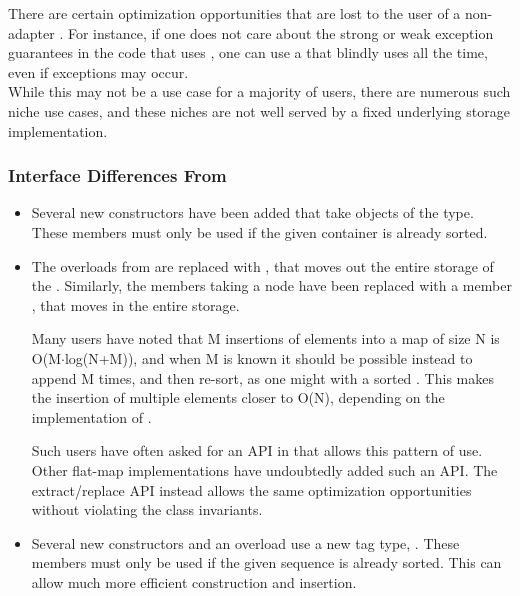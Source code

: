 There are certain optimization opportunities that are lost to the user of a
non-adapter .  For instance, if one does not care about the
strong or weak exception guarantees in the code that uses , one
can use a  that blindly uses  all the time, even if
exceptions may occur.\\

While this may not be a use case for a majority of users, there are numerous
such niche use cases, and these niches are not well served by a fixed
underlying storage implementation.

\subsubsection{Interface Differences From }

\begin{itemize}
  \item Several new constructors have been added that take objects of the
     type.  These members must only be used if the given
    container is already sorted.

  \item The  overloads from  are replaced with
    , that moves out the entire storage of the
    .  Similarly, the  members taking a node
    have been replaced with a member , that
    moves in the entire storage.

    Many users have noted that M insertions of elements into a map of size N
    is O(M$\cdot$log(N+M)), and when M is known it should be possible instead
    to append M times, and then re-sort, as one might with a sorted
    .  This makes the insertion of multiple elements closer to
    O(N), depending on the implementation of .

    Such users have often asked for an API in
     that allows this pattern of use.  Other
    flat-map implementations have undoubtedly added such an API.  The
    extract/replace API instead allows the same optimization opportunities
    without violating the class invariants.

  \item Several new constructors and an  overload use a new tag
    type, .  These members must only be used
    if the given sequence is already sorted.  This can allow much more
    efficient construction and insertion.
\end{itemize}

